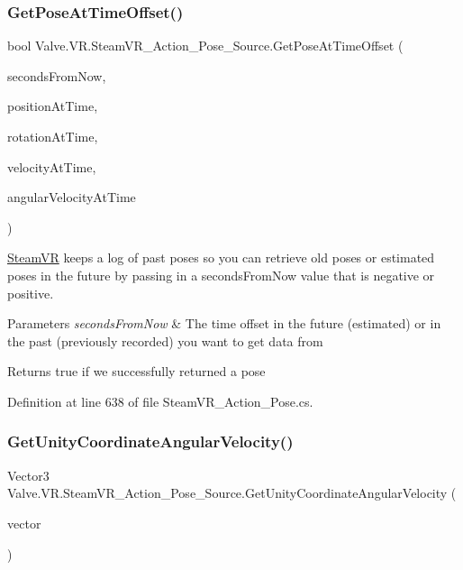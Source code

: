 \subsubsection{\texorpdfstring{GetPoseAtTimeOffset()}{GetPoseAtTimeOffset()}}
{\footnotesize\ttfamily bool Valve.\+V\+R.\+Steam\+V\+R\+\_\+\+Action\+\_\+\+Pose\+\_\+\+Source.\+Get\+Pose\+At\+Time\+Offset (\begin{DoxyParamCaption}\item[{float}]{seconds\+From\+Now,  }\item[{out Vector3}]{position\+At\+Time,  }\item[{out Quaternion}]{rotation\+At\+Time,  }\item[{out Vector3}]{velocity\+At\+Time,  }\item[{out Vector3}]{angular\+Velocity\+At\+Time }\end{DoxyParamCaption})}



\mbox{\hyperlink{class_valve_1_1_v_r_1_1_steam_v_r}{Steam\+VR}} keeps a log of past poses so you can retrieve old poses or estimated poses in the future by passing in a seconds\+From\+Now value that is negative or positive. 


\begin{DoxyParams}{Parameters}
{\em seconds\+From\+Now} & The time offset in the future (estimated) or in the past (previously recorded) you want to get data from\\
\hline
\end{DoxyParams}
\begin{DoxyReturn}{Returns}
true if we successfully returned a pose
\end{DoxyReturn}


Definition at line 638 of file Steam\+V\+R\+\_\+\+Action\+\_\+\+Pose.\+cs.

\mbox{\label{class_valve_1_1_v_r_1_1_steam_v_r___action___pose___source_a836f6fa0ef1c1c8d8bc4334607643f1b}} 
\subsubsection{\texorpdfstring{GetUnityCoordinateAngularVelocity()}{GetUnityCoordinateAngularVelocity()}\hspace{0.1cm}{\footnotesize\ttfamily [1/2]}}
{\footnotesize\ttfamily Vector3 Valve.\+V\+R.\+Steam\+V\+R\+\_\+\+Action\+\_\+\+Pose\+\_\+\+Source.\+Get\+Unity\+Coordinate\+Angular\+Velocity (\begin{DoxyParamCaption}\item[{\mbox{\hyperlink{struct_valve_1_1_v_r_1_1_hmd_vector3__t}{Hmd\+Vector3\+\_\+t}}}]{vector }\end{DoxyParamCaption})\hspace{0.3cm}{\ttfamily [protected]}}



